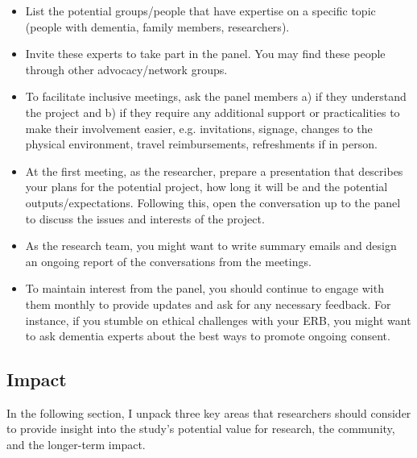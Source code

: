 \begin{itemize}
    \item List the potential groups/people that have expertise on a specific topic (people with dementia, family members, researchers).
    \item Invite these experts to take part in the panel. You may find these people through other advocacy/network groups.
    \item To facilitate inclusive meetings, ask the panel members a) if they understand the project and b) if they require any additional support or practicalities to make their involvement easier, e.g. invitations, signage, changes to the physical environment, travel reimbursements, refreshments if in person.
    \item At the first meeting, as the researcher, prepare a presentation that describes your plans for the potential project, how long it will be and the potential outputs/expectations. Following this, open the conversation up to the panel to discuss the issues and interests of the project.
    \item As the research team, you might want to write summary emails and design an ongoing report of the conversations from the meetings. 
    \item To maintain interest from the panel, you should continue to engage with them monthly to provide updates and ask for any necessary feedback. For instance, if you stumble on ethical challenges with your ERB, you might want to ask dementia experts about the best ways to promote ongoing consent. 

\end{itemize}

\subsection{Impact}
\label{Impact}
In the following section, I unpack three key areas that researchers should consider to provide insight into the study's potential value for research, the community, and the longer-term impact.

